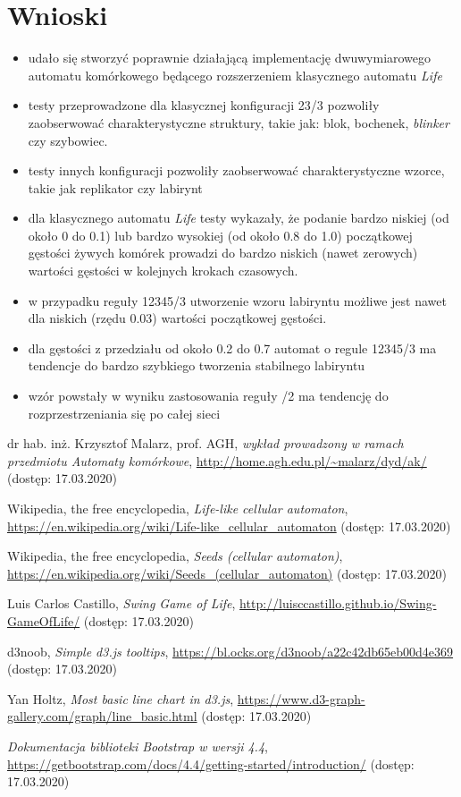 \documentclass[12pt] {article}
\begin{document}
\section{Wnioski}
\begin{itemize}
\item udało się stworzyć poprawnie działającą implementację dwuwymiarowego automatu komórkowego będącego rozszerzeniem klasycznego automatu \textit{Life}
\item testy przeprowadzone dla klasycznej konfiguracji 23/3 pozwoliły zaobserwować charakterystyczne struktury, takie jak: blok, bochenek, \textit{blinker} czy szybowiec.
\item testy innych konfiguracji pozwoliły zaobserwować charakterystyczne wzorce, takie jak replikator czy labirynt
\item dla klasycznego automatu \textit{Life} testy wykazały, że podanie bardzo niskiej (od około 0 do 0.1) lub bardzo wysokiej (od około 0.8 do 1.0) początkowej gęstości żywych komórek prowadzi do bardzo niskich (nawet zerowych) wartości gęstości w kolejnych krokach czasowych.
\item w przypadku reguły 12345/3 utworzenie wzoru labiryntu możliwe jest nawet dla niskich (rzędu 0.03) wartości początkowej gęstości.
\item dla gęstości z przedziału od około 0.2 do 0.7 automat o regule 12345/3 ma tendencje do bardzo szybkiego tworzenia stabilnego labiryntu
\item wzór powstały w wyniku zastosowania reguły /2 ma tendencję do rozprzestrzeniania się po całej sieci
\end{itemize}

\newpage

\begin{thebibliography}{9}

  dr hab. inż. Krzysztof Malarz, prof. AGH,
  \emph{wykład prowadzony w ramach przedmiotu Automaty komórkowe},
  \url{http://home.agh.edu.pl/~malarz/dyd/ak/} (dostęp: 17.03.2020)

  Wikipedia, the free encyclopedia,
  \emph{Life-like cellular automaton},
  \url{https://en.wikipedia.org/wiki/Life-like_cellular_automaton} (dostęp: 17.03.2020)

  Wikipedia, the free encyclopedia,
  \emph{Seeds (cellular automaton)},
  \url{https://en.wikipedia.org/wiki/Seeds_(cellular_automaton)} (dostęp: 17.03.2020)

  Luis Carlos Castillo,
  \emph{Swing Game of Life},
  \url{http://luisccastillo.github.io/Swing-GameOfLife/} (dostęp: 17.03.2020)

  d3noob,
  \emph{Simple d3.js tooltips},
  \url{https://bl.ocks.org/d3noob/a22c42db65eb00d4e369} (dostęp: 17.03.2020)

  Yan Holtz,
  \emph{Most basic line chart in d3.js},
  \url{https://www.d3-graph-gallery.com/graph/line_basic.html} (dostęp: 17.03.2020)

  \emph{Dokumentacja biblioteki Bootstrap w wersji 4.4},
  \url{https://getbootstrap.com/docs/4.4/getting-started/introduction/} (dostęp: 17.03.2020)

\end{thebibliography}
\end{document}
